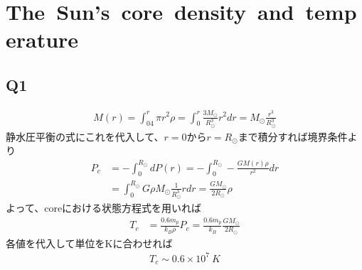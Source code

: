 \section{The\ Sun's\ core\ density\ and\ temperature}
\subsection{Q1}
\begin{align*}
    M(r)=\int^r_04\pi r^2\rho=\int^r_0\frac{3M_{\odot}}{R^3_{\odot}}r^2dr=M_{\odot}\frac{r^3}{R^3_{\odot}}
\end{align*}
静水圧平衡の式にこれを代入して、$r=0$から$r=R_{\odot}$まで積分すれば境界条件より
\begin{align*}
    P_c&=-\int^{R_{\odot}}_0dP(r)=-\int^{R_{\odot}}_0-\frac{GM(r)\rho}{r^2}dr\\
    &=\int^{R_{\odot}}_0G\rho M_{\odot}\frac{1}{R^3_{\odot}}rdr=\frac{GM_{\odot}}{2R_{\odot}}\rho
\end{align*}
よって、coreにおける状態方程式を用いれば
\begin{align*}
    T_c&=\frac{0.6m_p}{k_B\rho}P_c=\frac{0.6m_p}{k_B}\frac{GM_{\odot}}{2R_{\odot}}
\end{align*}
各値を代入して単位をKに合わせれば
\begin{align}
    T_c\sim0.6\times10^7\ K
\end{align}

